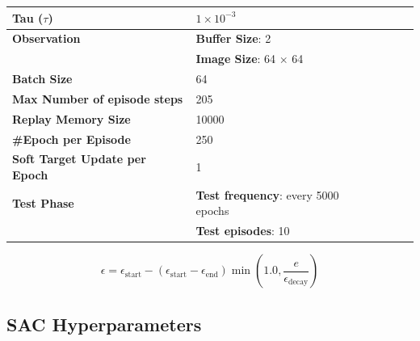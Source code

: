 \begin{table}[!h]
{\begin{tabular}{@{}lllll@{}}
            \textbf{Tau ($\tau$)}                 & $1 \times 10^{-3}$                                                \\\midrule
            \textbf{Observation}                  & \textbf{Buffer Size}: 2                                           \\
                                                  & \textbf{Image Size}: 64 $\times$ 64                               \\\midrule
            \textbf{Batch Size}                   & 64                                                                \\\midrule
            \textbf{Max Number of episode steps}  & 205                                                               \\\midrule
            \textbf{Replay Memory Size}           & 10000                                                             \\\midrule

            \textbf{\#Epoch per Episode}          & 250                                                               \\\midrule
            \textbf{Soft Target Update per Epoch} & 1                                                                 \\\midrule
            \textbf{Test Phase}                   & \textbf{Test frequency}: every 5000 epochs                        \\
                                                  & \textbf{Test episodes}: 10                                        \\
            \bottomrule
        \end{tabular}}
\end{table}

\begin{equation}
    \label{eq:epsilon_decay}
    \epsilon = \epsilon_{\text{start}} - (\epsilon_{\text{start}} -\epsilon_{\text{end}})\min(1.0, \frac{e}{\epsilon_{\text{decay}}})
\end{equation}

\FloatBarrier

\subsection{SAC Hyperparameters}

